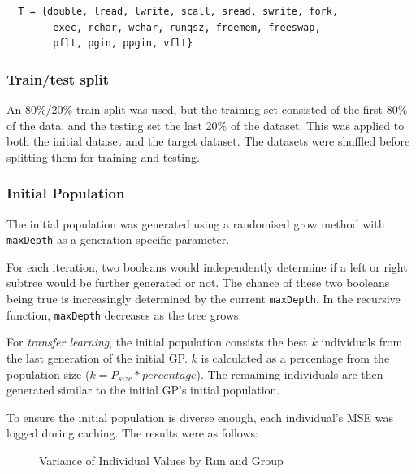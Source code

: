 \documentclass{article}
\begin{document}
\begin{verbatim}
  T = {double, lread, lwrite, scall, sread, swrite, fork,
        exec, rchar, wchar, runqsz, freemem, freeswap, 
        pflt, pgin, ppgin, vflt}
\end{verbatim}

\subsubsection{Train/test split}
An 80\%/20\% train split was used, but the training set consisted of the first 80\% of the data, and the testing set the last 20\% of the dataset. This was applied to both the initial dataset and the target dataset. The datasets were shuffled before splitting them for training and testing.

\subsubsection{Initial Population}
The initial population was generated using a randomised grow method with \texttt{maxDepth} as a generation-specific parameter.

For each iteration, two booleans would independently determine if a left or right subtree would be further generated or not. The chance of these two booleans being true is increasingly determined by the current \texttt{maxDepth}. In the recursive function, \texttt{maxDepth} decreases as the tree grows.

\label{transferK}
For \emph{transfer learning}, the initial population consists the best \(k\) individuals from the last generation of the initial GP. \(k\) is calculated as a percentage from the population size (\(k = P_{size} * percentage\)). The remaining individuals are then generated similar to the initial GP's initial population.

To ensure the initial population is diverse enough, each individual's MSE was logged during caching. The results were as follows:

\begin{figure}[H]
  \caption{Variance of Individual Values by Run and Group}
\end{figure}
\end{document}
